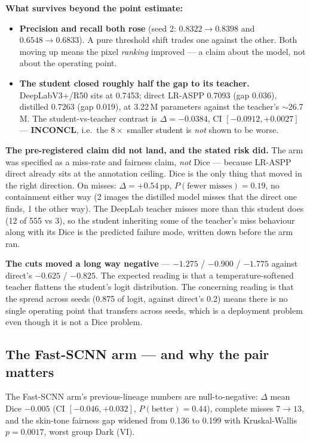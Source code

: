 \documentclass[11pt]{article}
\newcommand{\inc}{\textcolor{warnamber}{\textbf{INCONCL}}}
\begin{document}
\textbf{What survives beyond the point estimate:}

\begin{itemize}[leftmargin=*,itemsep=2pt]
\item \textbf{Precision and recall both rose} (seed 2: $0.8322\to0.8398$ and
$0.6548\to0.6833$). A pure threshold shift trades one against the other. Both
moving up means the pixel \emph{ranking} improved --- a claim about the model, not
about the operating point.
\item \textbf{The student closed roughly half the gap to its teacher.}
DeepLabV3+/R50 sits at 0.7453; direct LR-ASPP 0.7093 (gap 0.036), distilled
0.7263 (gap 0.019), at 3.22\,M parameters against the teacher's $\sim$26.7\,M. The
student-vs-teacher contrast is $\Delta=-0.0384$, CI $[-0.0912, +0.0027]$ ---
\inc, i.e.\ the $8\times$ smaller student is \emph{not} shown to be worse.
\end{itemize}

\textbf{The pre-registered claim did not land, and the stated risk did.} The arm
was specified as a miss-rate and fairness claim, \emph{not} Dice --- because
LR-ASPP direct already sits at the annotation ceiling. Dice is the only thing that
moved in the right direction. On misses: $\Delta = +0.54$\,pp,
$P(\text{fewer misses}) = 0.19$, no containment either way (2 images the distilled
model misses that the direct one finds, 1 the other way). The DeepLab teacher
misses more than this student does (12 of 555 vs 3), so the student inheriting some
of the teacher's miss behaviour along with its Dice is the predicted failure mode,
written down before the arm ran.

\textbf{The cuts moved a long way negative} --- $-1.275$ / $-0.900$ / $-1.775$
against direct's $-0.625$ / $-0.825$. The expected reading is that a
temperature-softened teacher flattens the student's logit distribution. The
concerning reading is that the spread across seeds (0.875 of logit, against
direct's 0.2) means there is no single operating point that transfers across
seeds, which is a deployment problem even though it is not a Dice problem.

\subsection{The Fast-SCNN arm --- and why the pair matters}

The Fast-SCNN arm's previous-lineage numbers are null-to-negative:
$\Delta$ mean Dice $-0.005$ (CI $[-0.046, +0.032]$, $P(\text{better})=0.44$),
complete misses $7\to13$, and the skin-tone fairness gap widened from 0.136 to
0.199 with Kruskal-Wallis $p=0.0017$, worst group Dark (VI).
\end{document}
